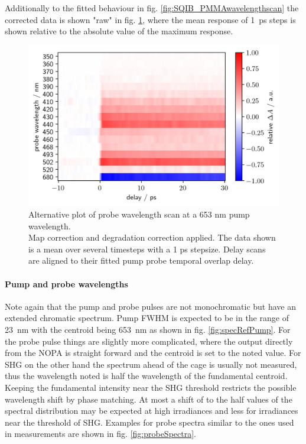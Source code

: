 \documentclass[twoside,openright]{scrreprt}
\begin{document}
Additionally to the fitted behaviour in fig. \ref{fig:SQIB_PMMAwavelengthscan} the corrected data is shown "raw" in fig. \ref{fig:SQIB_PMMA_rawWavs}, where the mean response of \SI{1}{\pico\second} steps is shown relative to the absolute value of the maximum response.
\begin{figure}[htp]
\centering
\includegraphics[scale=1]{images/RawishDataWavelengthScanSHG.png}
\caption{Alternative plot of probe wavelength scan at a 653 nm pump wavelength.\\Map correction and degradation correction applied. The data shown is a mean over several timesteps with a 1 ps stepsize. Delay scans are aligned to their fitted pump probe temporal overlap delay.\label{fig:SQIB_PMMA_rawWavs}}
\end{figure}
\paragraph{Pump and probe wavelengths}
Note again that the pump and probe pulses are not monochromatic but have an extended chromatic spectrum. Pump FWHM is expected to be in the range of \SI{23}{\nano\meter} with the centroid being \SI{653}{\nano\meter} as shown in fig. \ref{fig:specRefPump}. For the probe pulse things are slightly more complicated, where the output directly from the NOPA is straight forward and the centroid is set to the noted value. For SHG on the other hand the spectrum ahead of the cage is usually not measured, thus the wavelength noted is half the wavelength of the fundamental centroid. Keeping the fundamental intensity near the SHG threshold restricts the possible wavelength shift by phase matching. At most a shift of to the half values of the spectral distribution may be expected at high irradiances and less for irradiances near the threshold of SHG. Examples for probe spectra similar to the ones used in measurements are shown in fig. \ref{fig:probeSpectra}.
\end{document}
